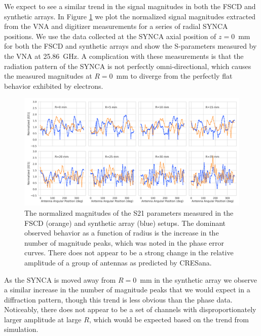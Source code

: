 We expect to see a similar trend in the signal magnitudes in both the FSCD and synthetic arrays. In Figure \ref{fig:jugaad_synth_mag_curve_comp} we plot the normalized signal magnitudes extracted from the VNA and digitizer measurements for a series of radial SYNCA positions. We use the data collected at the SYNCA axial position of $z=0$~mm for both the FSCD and synthetic arrays and show the S-parameters measured by the VNA at 25.86~GHz. A complication with these measurements is that the radiation pattern of the SYNCA is not perfectly omni-directional, which causes the measured magnitudes at $R=0$~mm to diverge from the perfectly flat behavior exhibited by electrons.
\begin{figure}[htbp]
    \centering
    \includegraphics[width=1\textwidth]{figs/Chapter-5/230412_jugaad_mag_curves_z0.png}
    \caption{The normalized magnitudes of the S21 parameters measured in the FSCD (orange) and synthetic array (blue) setups. The dominant observed behavior as a function of radius is the increase in the number of magnitude peaks, which was noted in the phase error curves. There does not appear to be a strong change in the relative amplitude of a group of antennas as predicted by CRESana.}
    \label{fig:jugaad_synth_mag_curve_comp}
\end{figure}
As the SYNCA is moved away from $R=0$~mm in the synthetic array we observe a similar increase in the number of magnitude peaks that we would expect in a diffraction pattern, though this trend is less obvious than the phase data. Noticeably, there does not appear to be a set of channels with disproportionately larger amplitude at large $R$, which would be expected based on the trend from simulation. 

